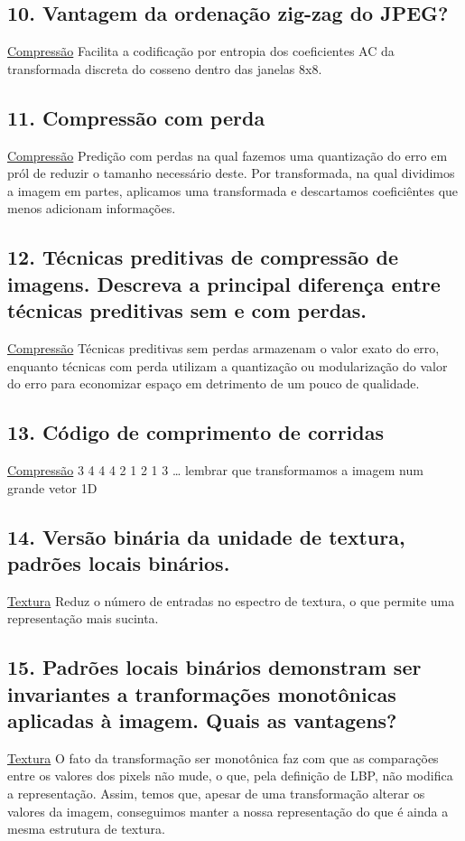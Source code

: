 \documentclass[twocolumn, 9pt]{article}
\begin{document}
\subsection*{10. Vantagem da ordenação zig-zag do JPEG?}
\label{sec:org58b4dcd}
\hyperref[sec:orge460ab4]{Compressão}
Facilita a codificação por entropia dos coeficientes AC da transformada discreta do cosseno dentro das janelas 8x8.
\subsection*{11. Compressão com perda}
\label{sec:org443f3fb}
\hyperref[sec:orge460ab4]{Compressão}
Predição com perdas na qual fazemos uma quantização do erro em pról de reduzir o tamanho necessário deste.
Por transformada, na qual dividimos a imagem em partes, aplicamos uma transformada e descartamos coeficiêntes que menos adicionam informações.
\subsection*{12. Técnicas preditivas de compressão de imagens. Descreva a principal diferença entre técnicas preditivas sem e com perdas.}
\label{sec:org6bb8724}
\hyperref[sec:orge460ab4]{Compressão}
Técnicas preditivas sem perdas armazenam o valor exato do erro, enquanto técnicas com perda utilizam a quantização ou modularização do valor do erro para economizar espaço em detrimento de um pouco de qualidade.
\subsection*{13. Código de comprimento de corridas}
\label{sec:org475fc7b}
\hyperref[sec:orge460ab4]{Compressão}
3 4 4 4 2 1 2 1 3 \ldots{}
lembrar que transformamos a imagem num grande vetor 1D
\subsection*{14. Versão binária da unidade de textura, padrões locais binários.}
\label{sec:orgd0248db}
\hyperref[sec:org48121c0]{Textura}
Reduz o número de entradas no espectro de textura, o que permite uma representação mais sucinta.
\subsection*{15. Padrões locais binários demonstram ser invariantes a tranformações monotônicas aplicadas à imagem. Quais as vantagens?}
\label{sec:org88e99aa}
\hyperref[sec:org48121c0]{Textura}
O fato da transformação ser monotônica faz com que as comparações entre os valores dos pixels não mude, o que, pela definição de LBP, não modifica a representação. Assim, temos que, apesar de uma transformação alterar os valores da imagem, conseguimos manter a nossa representação do que é ainda a mesma estrutura de textura.
\end{document}
